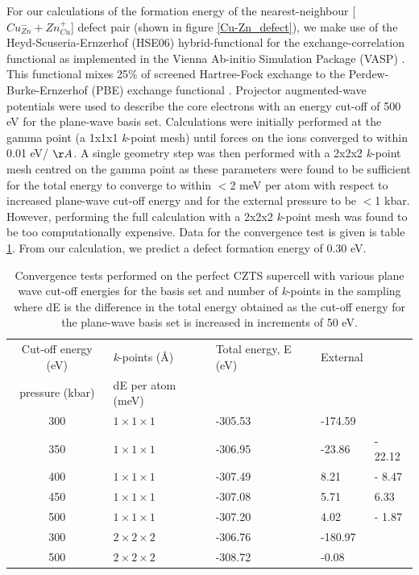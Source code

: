 For our calculations of the formation energy of the nearest-neighbour [$Cu_{Zn}^- + Zn_{Cu}^+$] defect pair (shown in figure \ref{Cu-Zn_defect}), we make use of the Heyd-Scuseria-Ernzerhof (HSE06) hybrid-functional \cite{HSE} for the exchange-correlation functional as implemented in the Vienna Ab-initio Simulation Package (VASP) \cite{VASP}. This functional mixes 25\% of screened Hartree-Fock exchange to the Perdew-Burke-Ernzerhof (PBE) exchange functional \cite{PBE}. Projector augmented-wave potentials \cite{PAW} were used to describe the core electrons with an energy cut-off of 500 eV for the plane-wave basis set. Calculations were initially performed at the gamma point (a 1x1x1 \textit{k}-point mesh) until forces on the ions converged to within 0.01 eV/ $\AA$. 
A single geometry step was then performed with a 2x2x2 \textit{k}-point mesh centred on the gamma point as these parameters were found to be sufficient for the total energy to converge to within $<$2 meV  per atom with respect to increased plane-wave cut-off energy and for the external pressure to be $<$1 kbar. However, performing the full calculation with a 2x2x2 \textit{k}-point mesh was found to be too computationally expensive. Data for the convergence test is given is table \ref{conv_test}. From our calculation, we predict a defect formation energy of 0.30 eV.
\begin{table}[h]
\centering
\begin{tabular}{c|l|l|l|l}
Cut-off energy (eV) & \textit{k}-points (\AA) & Total energy, E (eV) & External \\pressure (kbar) & dE per atom (meV)\\
\cline{1-5}
300 & $1\times1\times1$ & -305.53 & -174.59 & \\
350 & $1\times1\times1$ &  -306.95 & -23.86 & - 22.12\\
400 & $1\times1\times1$ &  -307.49 & 8.21 & - 8.47\\
450 & $1\times1\times1$ & -307.08 & 5.71 & 6.33\\
500 & $1\times1\times1$ & -307.20 & 4.02 & - 1.87\\
300 & $2\times2\times2$ & -306.76 & -180.97 & \\
500 & $2\times2\times2$ & -308.72 & -0.08 & \\
\end{tabular}
\caption{Convergence tests performed on the perfect CZTS supercell with various plane wave cut-off energies for the basis set and number of \textit{k}-points in the sampling where dE is the difference in the total energy obtained as the cut-off energy for the plane-wave basis set is increased in increments of 50 eV.}
\label{conv_test}
\end{table}

